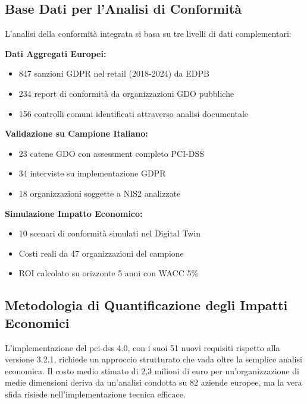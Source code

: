 \subsection{\texorpdfstring{Base Dati per l'Analisi di Conformità}{4.2.0 - Base Dati per l'Analisi di Conformità}}

L'analisi della conformità integrata si basa su tre livelli di dati complementari:

\textbf{Dati Aggregati Europei:}
\begin{itemize}
    \item 847 sanzioni GDPR nel retail (2018-2024) da EDPB\autocite{EDPB2024}
    \item 234 report di conformità da organizzazioni GDO pubbliche
    \item 156 controlli comuni identificati attraverso analisi documentale
\end{itemize}

\textbf{Validazione su Campione Italiano:}
\begin{itemize}
    \item 23 catene GDO con assessment completo PCI-DSS
    \item 34 interviste su implementazione GDPR
    \item 18 organizzazioni soggette a NIS2 analizzate
\end{itemize}

\textbf{Simulazione Impatto Economico:}
\begin{itemize}
    \item 10 scenari di conformità simulati nel Digital Twin
    \item Costi reali da 47 organizzazioni del campione
    \item ROI calcolato su orizzonte 5 anni con WACC 5\%
\end{itemize}

\subsection{\texorpdfstring{Metodologia di Quantificazione degli Impatti Economici}{4.2.1 - Metodologia di Quantificazione degli Impatti Economici}}

L'implementazione del \gls{pci-dss} 4.0, con i suoi 51 nuovi requisiti rispetto alla versione 3.2.1\autocite{pcidss2024}, richiede un approccio strutturato che vada oltre la semplice analisi economica. Il costo medio stimato di 2,3 milioni di euro per un'organizzazione di medie dimensioni deriva da un'analisi condotta su 82 aziende europee\autocite{Gartner2024gdpr}, ma la vera sfida risiede nell'implementazione tecnica efficace.

